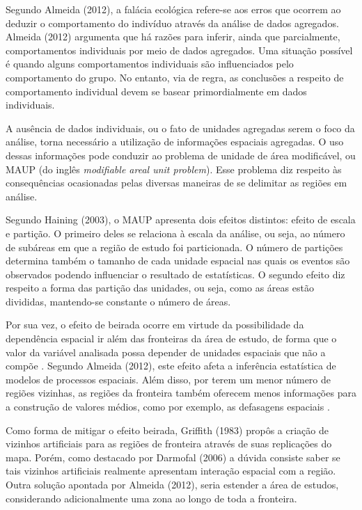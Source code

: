 \documentclass[12pt,a4paper]{article}
\begin{document}
Segundo Almeida (2012), a falácia ecológica refere-se aos erros que ocorrem ao deduzir o comportamento do indivíduo através da análise de dados agregados. Almeida (2012) argumenta que há razões para inferir, ainda que parcialmente, comportamentos individuais por meio de dados agregados. Uma situação possível é quando alguns comportamentos individuais são influenciados pelo comportamento do grupo. No entanto, via de regra, as conclusões a respeito de comportamento individual devem se basear primordialmente em dados individuais. 

A ausência de dados individuais, ou o fato de unidades agregadas serem o foco da análise, torna necessário a utilização de informações espaciais agregadas. O uso dessas informações pode conduzir ao problema de unidade de área modificável, ou MAUP (do inglês \textit{modifiable areal unit problem}). Esse problema diz respeito às consequências ocasionadas pelas diversas maneiras de se delimitar as regiões em análise. 
	
Segundo Haining (2003), o MAUP apresenta dois efeitos distintos: efeito de escala e partição. O primeiro deles se relaciona à escala da análise, ou seja, ao número de subáreas em que a região de estudo foi particionada. O número de partições determina também o tamanho de cada unidade espacial nas quais os eventos são observados podendo influenciar o resultado de estatísticas. O segundo efeito diz respeito a forma das partição das unidades, ou seja, como as  áreas estão divididas, mantendo-se constante o número de áreas.
	
Por sua vez, o efeito de beirada ocorre em virtude da possibilidade da dependência espacial ir além das fronteiras da área de estudo, de forma que o valor da variável analisada possa depender de unidades espaciais que não a compõe \cite{anselin88}. Segundo Almeida (2012), este efeito afeta a  inferência estatística de modelos de processos espaciais. Além disso, por terem um menor número de regiões vizinhas, as regiões da fronteira também oferecem menos informações para a construção de valores médios, como por exemplo, as defasagens espaciais \cite{almeida12_2}.
	
Como forma de mitigar o efeito beirada, Griffith (1983) propôs a criação de vizinhos artificiais para as regiões de fronteira através de suas replicações do mapa. Porém, como destacado por Darmofal (2006) a dúvida consiste saber se tais vizinhos artificiais realmente apresentam interação espacial com a região. Outra solução apontada por Almeida (2012), seria estender a área de estudos, considerando adicionalmente uma zona ao longo de toda a fronteira.
	
\end{document}
